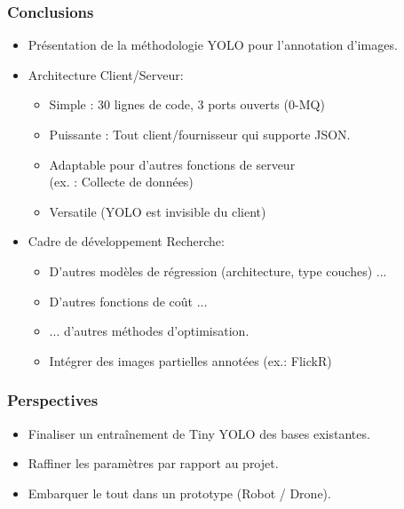 \documentclass[11pt]{beamer}
\begin{document}
\begin{frame}
\frametitle{Conclusions}
\begin{itemize}
\item Présentation de la méthodologie YOLO pour l'annotation d'images.
\pause
\item Architecture Client/Serveur:
\begin{itemize}
\item Simple : 30 lignes de code, 3 ports ouverts (0-MQ)
\item Puissante : Tout client/fournisseur qui supporte JSON.
\item Adaptable pour d'autres fonctions de serveur \\
(ex. : Collecte de données)
\item Versatile (YOLO est invisible du client)
\end{itemize}
\pause
\item Cadre de développement Recherche:
\begin{itemize}
\item D'autres modèles de régression (architecture, type couches) ...
\item D'autres fonctions de coût ...
\item ... d'autres méthodes d'optimisation.
\item Intégrer des images partielles annotées (ex.: FlickR)
\end{itemize}
\end{itemize}
\end{frame}

\begin{frame}
\frametitle{Perspectives}
\begin{itemize}
\item Finaliser un entraînement de Tiny YOLO des bases existantes.
\item Raffiner les paramètres par rapport au projet.
\item Embarquer le tout dans un prototype (Robot / Drone).
\end{itemize}
\begin{flushright}
\end{flushright}
\end{frame}
\end{document}
